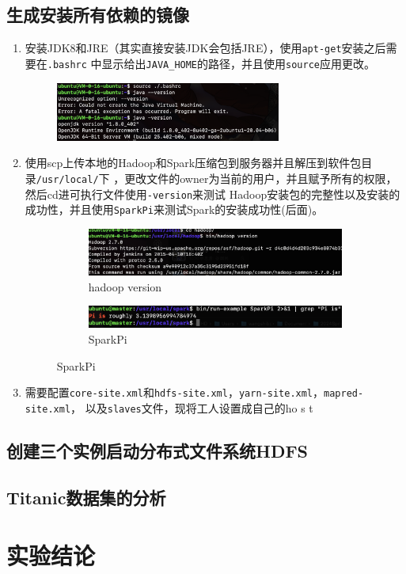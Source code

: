 \documentclass{article}
\begin{document}
\subsection{生成安装所有依赖的镜像}
\begin{enumerate}
    \item 安装JDK8和JRE（其实直接安装JDK会包括JRE），使用\texttt{apt-get}安装之后需要在\texttt{.bashrc}
    中显示给出\texttt{JAVA\_HOME}的路径，并且使用\texttt{source}应用更改。
    \begin{figure}[H]
        \centering
        \includegraphics[width=0.7\textwidth]{java.png}
    \end{figure}
    \item 使用scp上传本地的Hadoop和Spark压缩包到服务器并且解压到软件包目录\texttt{/usr/local/}下
    ，更改文件的owner为当前的用户，并且赋予所有的权限，然后cd进可执行文件使用\texttt{-version}来测试
    Hadoop安装包的完整性以及安装的成功性，并且使用\texttt{SparkPi}来测试Spark的安装成功性(后面)。
    \begin{figure}[H]
        \begin{subfigure}{0.6\textwidth}
            \centering
            \includegraphics[width=\textwidth]{hadoopinstall.png}
            \caption*{hadoop version}
        \end{subfigure}
        \hfill
        \begin{subfigure}{0.35\textwidth}
            \centering
            \includegraphics[width=\textwidth]{sparkpi.png}
            \caption*{SparkPi}
        \end{subfigure}
    \end{figure}
    \item 需要配置\texttt{core-site.xml}和\texttt{hdfs-site.xml}，\texttt{yarn-site.xml}，\texttt{mapred-site.xml}，
    以及\texttt{slaves}文件，现将工人设置成自己的ho s t
    
\end{enumerate}
\subsection{创建三个实例启动分布式文件系统HDFS}

\subsection{Titanic数据集的分析}

\section{实验结论}
\end{document}
